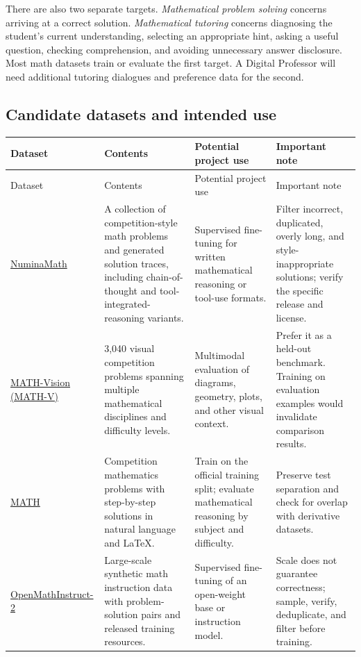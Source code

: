 \documentclass[11pt]{article}
\begin{document}
There are also two separate targets. \emph{Mathematical problem solving} concerns arriving at a correct solution. \emph{Mathematical tutoring} concerns diagnosing the student's current understanding, selecting an appropriate hint, asking a useful question, checking comprehension, and avoiding unnecessary answer disclosure. Most math datasets train or evaluate the first target. A Digital Professor will need additional tutoring dialogues and preference data for the second.

\subsection{Candidate datasets and intended use}
\begin{longtable}{@{}P{0.19\textwidth}P{0.27\textwidth}P{0.27\textwidth}P{0.19\textwidth}@{}}
\toprule
Dataset & Contents & Potential project use & Important note \\
\midrule
\endfirsthead
\toprule Dataset & Contents & Potential project use & Important note \\
\midrule
\endhead
\href{https://huggingface.co/collections/AI-MO/numinamath}{NuminaMath} \cite{numinamath} & A collection of competition-style math problems and generated solution traces, including chain-of-thought and tool-integrated-reasoning variants. & Supervised fine-tuning for written mathematical reasoning or tool-use formats. & Filter incorrect, duplicated, overly long, and style-inappropriate solutions; verify the specific release and license. \\
\addlinespace
\href{https://github.com/mathllm/MATH-V}{MATH-Vision (MATH-V)} \cite{mathvision} & 3,040 visual competition problems spanning multiple mathematical disciplines and difficulty levels. & Multimodal evaluation of diagrams, geometry, plots, and other visual context. & Prefer it as a held-out benchmark. Training on evaluation examples would invalidate comparison results. \\
\addlinespace
\href{https://github.com/hendrycks/math}{MATH} \cite{mathdataset} & Competition mathematics problems with step-by-step solutions in natural language and LaTeX. & Train on the official training split; evaluate mathematical reasoning by subject and difficulty. & Preserve test separation and check for overlap with derivative datasets. \\
\addlinespace
\href{https://huggingface.co/datasets/nvidia/OpenMathInstruct-2}{OpenMathInstruct-2} \cite{openmath} & Large-scale synthetic math instruction data with problem-solution pairs and released training resources. & Supervised fine-tuning of an open-weight base or instruction model. & Scale does not guarantee correctness; sample, verify, deduplicate, and filter before training. \\

\end{longtable}
\end{document}
